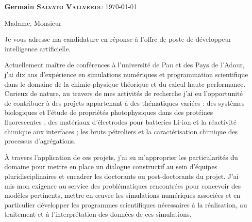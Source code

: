 \documentclass[11pt,a4paper,ragged2e]{../alta_letter}
\begin{document}
\name{}
\tagline{}


{\color{emphasis}\Large\bfseries Germain \textsc{Salvato Vallverdu}}
\hfill\today\par

\parbox{.5\textwidth}{\makecvheader}

\justify

\vspace{-5mm}
\cvsection{~}

\setlength{\parindent}{0pt}
\setlength{\parskip}{1.5ex plus 0.5ex minus 0.5ex}

\bigskip

Madame, Monsieur

\medskip
\onehalfspacing

Je vous adresse ma candidature en réponse à l'offre de poste de développeur intelligence artificielle.

Actuellement maître de conférences à l'université de Pau et des Pays de l'Adour, j'ai dix ans d'expérience en simulations numériques et programmation scientifique dans le domaine de la chimie-physique théorique et du calcul haute performance. Curieux de nature, au travers de mes activités de recherche j'ai eu l'opportunité de contribuer à des projets appartenant à des thématiques variées : des systèmes biologiques et l'étude de propriétés photophysiques dans des protéines fluorescentes ; des matériaux d'électrodes pour batteries Li-ion et la réactivité chimique aux interfaces ; les bruts pétroliers et la caractérisation chimique des processus d'agrégations.

À travers l'application de ces projets, j'ai su m'approprier les particularités du domaine pour mettre en place un dialogue constructif au sein d'équipes pluridisciplinaires et encadrer les doctorants ou post-doctorants du projet. J'ai mis mon exigence au service des problématiques rencontrées pour concevoir des modèles pertinents, mettre en œuvre les simulations numériques associées et en particulier développer les programmes scientifiques nécessaires à la réalisation, au traitement et à l'interprétation des données de ces simulations.
\end{document}
